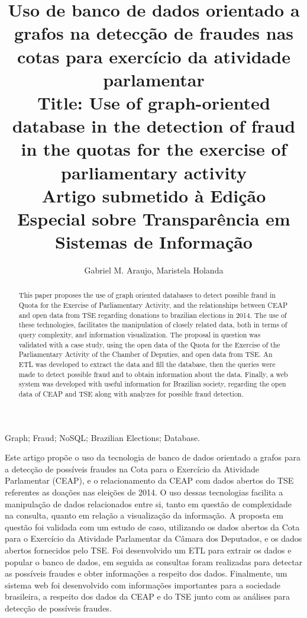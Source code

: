 \documentclass[12pt]{article}
\title{Uso de banco de dados orientado a grafos na detecção de fraudes nas cotas para exercício da atividade parlamentar\\
\medskip
Title: Use of graph-oriented database in the detection of fraud in the quotas for the exercise of parliamentary activity\\
\medskip
Artigo submetido à Edição Especial sobre Transparência em Sistemas de Informação}
\author{Gabriel M. Araujo\inst{1}, Maristela Holanda\inst{1}}
\begin{document}
 
\maketitle
\thispagestyle{plain}


\begin{abstract}
  This paper proposes the use of graph oriented databases to detect possible fraud in Quota for
the Exercise of Parliamentary Activity, and the relationships between CEAP and open data from TSE regarding donations to brazilian elections in 2014. The use
of these technologies, facilitates the manipulation of closely related data, both in
terms of query complexity, and information visualization. The proposal in question was
validated with a case study, using the open data of the Quota for the Exercise of the
Parliamentary Activity of the Chamber of Deputies, and open data from TSE. An ETL was developed to extract
the data and fill the database, then the queries were made to detect possible fraud and to obtain information about the data. Finally, a web system was developed with useful information for Brazilian society, regarding the open data of CEAP and TSE along with analyzes for possible fraud detection.
\end{abstract}

\begin{keywords}
Graph; Fraud; NoSQL; Brazilian Elections; Database.
\end{keywords}

\begin{resumo} 
  Este artigo propõe o uso da tecnologia de banco de dados orientado a grafos para a
detecção de possíveis fraudes na Cota para o Exercício da Atividade Parlamentar (CEAP), e o relacionamento da CEAP com dados abertos do TSE referentes as doações nas eleições de 2014. O uso dessas tecnologias facilita a manipulação de dados relacionados entre si, tanto em questão de complexidade na consulta, quanto em
relação a visualização da informação. A proposta em questão foi validada com um estudo
de caso, utilizando os dados abertos da Cota para o Exercício da Atividade Parlamentar da
Câmara dos Deputados, e os dados abertos fornecidos pelo TSE. Foi desenvolvido um ETL para extrair os dados e popular o banco de dados,
em seguida as consultas foram realizadas para detectar as possíveis fraudes e obter informações a respeito dos dados. Finalmente, um sistema web foi desenvolvido com informações importantes para a sociedade brasileira, a respeito dos dados da CEAP e do TSE junto com as análises para detecção de possíveis fraudes.
\end{resumo}
\end{document}
